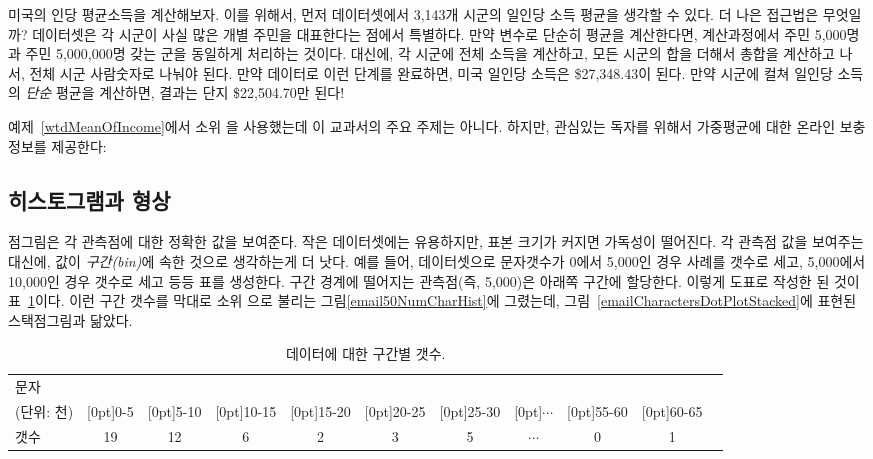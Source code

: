 \begin{example}{
미국의 인당 평균소득을 계산해보자.
이를 위해서, 먼저  데이터셋에서 3,143개 시군의 일인당 소득 평균을 생각할 수 있다.
더 나은 접근법은 무엇일까?} \label{wtdMeanOfIncome}
 데이터셋은 각 시군이 사실 많은 개별 주민을 대표한다는 점에서 특별하다.
만약  변수로 단순히 평균을 계산한다면, 계산과정에서 주민 5,000명과 주민 5,000,000명 갖는 군을 동일하게 처리하는 것이다.
대신에, 각 시군에 전체 소득을 계산하고, 모든 시군의 합을 더해서 총합을 계산하고 나서, 전체 시군 사람숫자로 나눠야 된다.
만약  데이터로 이런 단계를 완료하면, 미국 일인당 소득은 \$27,348.43이 된다.
만약 시군에 컬쳐 일인당 소득의 \emph{단순} 평균을 계산하면, 결과는 단지 \$22,504.70만 된다!
\end{example}

예제~\ref{wtdMeanOfIncome}에서 소위 을 사용했는데 이 교과서의 주요 주제는 아니다.
하지만, 관심있는 독자를 위해서 가중평균에 대한 온라인 보충정보를 제공한다:

\begin{center}
\end{center}

\subsection{히스토그램과 형상}
\label{histogramsAndShape}

점그림은 각 관측점에 대한 정확한 값을 보여준다.
작은 데이터셋에는 유용하지만, 표본 크기가 커지면 가독성이 떨어진다.
각 관측점 값을 보여주는 대신에, 값이 \emph{구간(bin)}에 속한 것으로 생각하는게 더 낫다.
예를 들어,  데이터셋으로
문자갯수가 0에서 5,000인 경우 사례를 갯수로 세고, 5,000에서 10,000인 경우 갯수로 세고 등등 표를 생성한다.
구간 경계에 떨어지는 관측점(즉, 5,000)은 아래쪽 구간에 할당한다.
이렇게 도표로 작성한 된 것이 표~\ref{binnedNumCharTable}이다.
이런 구간 갯수를 막대로 소위 으로 불리는 그림\ref{email50NumCharHist}에 그렸는데, 그림~\ref{emailCharactersDotPlotStacked}에 표현된 스택점그림과 닮았다.

\begin{table}[ht]
\centering\small
\begin{tabular}{l ccc ccc ccc c}
  \hline
문자 & \\
(단위: 천) & \raisebox{1.5ex}[0pt]{0-5} & \raisebox{1.5ex}[0pt]{5-10} & \raisebox{1.5ex}[0pt]{10-15} & \raisebox{1.5ex}[0pt]{15-20} & \raisebox{1.5ex}[0pt]{20-25} & \raisebox{1.5ex}[0pt]{25-30} & \raisebox{1.5ex}[0pt]{$\cdots$} & \raisebox{1.5ex}[0pt]{55-60} & \raisebox{1.5ex}[0pt]{60-65} \\
  \hline
갯수 & 19 & 12 & 6 & 2 & 3 & 5 & $\cdots$ & 0 & 1 \\
  \hline
\end{tabular}
\caption{ 데이터에 대한 구간별 갯수.}
\label{binnedNumCharTable}
\end{table}

